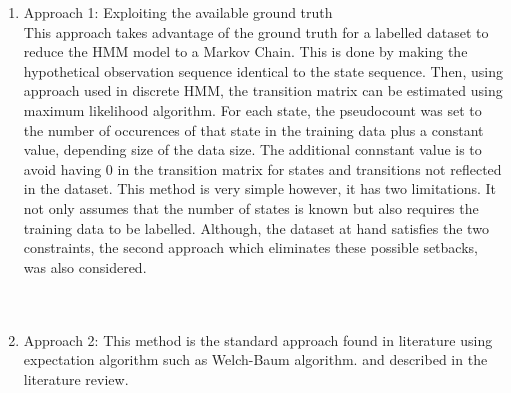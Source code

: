 \begin{enumerate}
	\item Approach 1: Exploiting the available ground truth\\
	This approach takes advantage of the ground truth for a labelled dataset to reduce the HMM model to a Markov Chain. This is done by making the hypothetical observation sequence identical to the state sequence. Then, using approach used in discrete HMM, %
	the transition matrix can be estimated using maximum likelihood algorithm. %
	For each state, the pseudocount was set to the number of occurences of that state in the training data plus a constant value, depending size of the data size. The additional connstant value is to avoid having 0 in the transition matrix for states and transitions not reflected in the dataset.
	This method is very simple however, it has two limitations. It not only assumes that the number of states is known but also requires the training data to be labelled. Although, the dataset at hand satisfies the two constraints, the second approach which eliminates these possible setbacks, was also considered. \\\\\
	
	\item Approach 2: This method is the standard approach found in literature using expectation algorithm such as Welch-Baum algorithm. %
	and described in the literature review. %
\end{enumerate}


